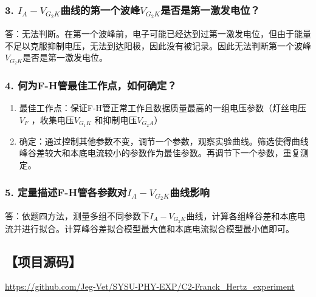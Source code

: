 \documentclass[12pt,a4paper,UTF8]{ctexart}
\begin{document}
	\subsubsection*{3. $I_A-V_{G_2K}$曲线的第一个波峰$V_{G_2K}$是否是第一激发电位？}
		答：无法判断。在第一个波峰前，电子可能已经达到过第一激发电位，但由于能量不足以克服抑制电压，无法到达阳极，因此没有被记录。因此无法判断第一个波峰$V_{G_2K}$是否是第一激发电位。
	\subsubsection*{4. 何为F-H管最佳工作点，如何确定？}
		\begin{enumerate}[label=\arabic*.]
			\item 最佳工作点：保证F-H管正常工作且数据质量最高的一组电压参数（灯丝电压$V_F$  ，收集电压$V_{G_1K}$ 和抑制电压$V_{G_2A}$）
			\item 确定：通过控制其他参数不变，调节一个参数，观察实验曲线。筛选使得曲线峰谷差较大和本底电流较小的参数作为最佳参数。再调节下一个参数，重复测定。
		\end{enumerate}
	\subsubsection*{5. 定量描述F-H管各参数对$I_A-V_{G_2K}$曲线影响}
		答：依题四方法，测量多组不同参数下$I_A-V_{G_2K}$曲线，计算各组峰谷差和本底电流并进行拟合。计算峰谷差拟合模型最大值和本底电流拟合模型最小值即可。

\subsection*{【项目源码】}
\url{https://github.com/Jeg-Vet/SYSU-PHY-EXP/C2-Franck_Hertz_experiment}
		
\end{document}
